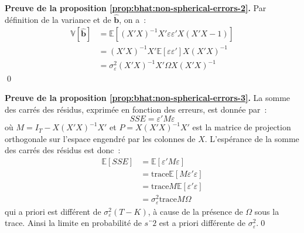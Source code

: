 \documentclass[10pt]{beamer}
\theoremstyle{plain}
\begin{document}
\begin{notes}

  \textbf{Preuve de la proposition \ref{prop:bhat:non-spherical-errors-2}.} Par définition de la variance et de $\hat{\textbf{b}}$, on a~:
  \[
    \begin{split}
      \mathbb V\left[\hat{\textbf{b}}\right] &= \mathbb E \left[(X'X)^{-1}X'\varepsilon\varepsilon' X (X'X-1) \right]\\
                                             &= (X'X)^{-1}X'\mathbb E[\varepsilon\varepsilon']X(X'X)^{-1}\\
      &= \sigma_{\varepsilon}^2(X'X)^{-1}X'\Omega X (X'X)^{-1}
    \end{split}
  \]
  \qed

  \bigskip

  \textbf{Preuve de la proposition \ref{prop:bhat:non-spherical-errors-3}.} La somme des carrés des résidus, exprimée en fonction des erreurs, est donnée par~:
  \[
    SSE = \varepsilon' M \varepsilon
  \]
  où $M= I_T - X (X'X)^{-1}X'$ et $P = X(X'X)^{-1}X'$ est la matrice
  de projection orthogonale sur l'espace engendré par les colonnes
  de $X$. L'espérance de la somme des carrés des résidus est donc~:
  \[
    \begin{split}
      \mathbb E[SSE] &= \mathbb E \left[\varepsilon' M \varepsilon \right]\\
                     &= \text{trace} \mathbb E [M\varepsilon'\varepsilon]\\
                     &= \text{trace} M \mathbb E [\varepsilon'\varepsilon]\\
                     &= \sigma_{\varepsilon}^{2}\text{trace} M\Omega
    \end{split}
  \]
  qui a priori est différent de $\sigma_{\varepsilon}^2(T-K)$, à cause de la présence de $\Omega$ sous la trace. Ainsi la limite en probabilité de $s¨2$ est a priori différente de $\sigma_{\varepsilon}^2$.\qed

\end{notes}
\end{document}
